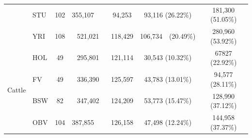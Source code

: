 \documentclass[../main.tex]{subfiles}
\begin{document}
\begin{flushleft}
\begin{landscape}
\begin{table}
\begin{tabular}{|c|l|c|c|c|c|c|}
    \cline{2-7}
                            & STU                             & 102                                                         & 355,107~~~    & 94,253                                                       & 93,116 (26.22\%)                                             & 181,300 (51.05\%)                                                                           \\ 
    \cline{2-7}
                            & YRI                             & 108                                                         & 521,021       & 118,429                                                      & 106,734~~(20.49\%)                                           & 280,960 (53.92\%)                                                                           \\ 
    \hline
    \multirow{4}{*}{Cattle} & HOL                             & 49                                                          & 295,801       & 121,114                                                      & 30,543 (10.32\%)                                             & 67827 (22.92\%)                                                                             \\ 
    \cline{2-7}
                            & FV                              & 49                                                          & 336,390       & 125,597                                                      & 43,783 (13.01\%)                                             & 94,577 (28.11\%)                                                                            \\ 
    \cline{2-7}
                            & BSW                             & 82                                                          & 347,402       & 124,209                                                      & 53,773 (15.47\%)                                             & 128,990 (37.12\%)                                                                           \\ 
    \cline{2-7}
                            & OBV                             & 104                                                         & 387,855~~~    & 126,158                                                      & 47,498 (12.24\%)                                             & 144,958 (37.37\%)                                                                           \\
    \hline
    \end{tabular}
   \end{table}



\end{landscape}
\end{flushleft}
\end{document}
